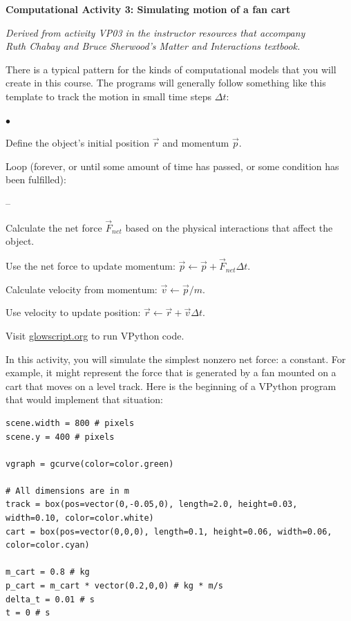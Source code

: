 \documentclass[11pt]{article}
\newcommand{\squishlist}{
   \begin{list}{$\bullet$}
    { \setlength{\itemsep}{0pt}      \setlength{\parsep}{3pt}
      \setlength{\topsep}{3pt}       \setlength{\partopsep}{0pt}
      \setlength{\leftmargin}{1.5em} \setlength{\labelwidth}{1em}
      \setlength{\labelsep}{0.5em} } }
\newcommand{\squishlistB}{
   \begin{list}{--}
    { \setlength{\itemsep}{0pt}      \setlength{\parsep}{3pt}
      \setlength{\topsep}{3pt}       \setlength{\partopsep}{0pt}
      \setlength{\leftmargin}{1.5em} \setlength{\labelwidth}{1em}
      \setlength{\labelsep}{0.5em} } }
\newcommand{\squishend}{
    \end{list}  }
\begin{document}
\begin{center}
\medskip
{\bf{Computational Activity 3: Simulating motion of a fan cart}} 
\medskip

{\em{Derived from activity VP03 in the instructor resources that
 accompany \\ Ruth Chabay and Bruce Sherwood's {\em Matter and Interactions} 
 textbook.}}
\medskip
\end{center}

There is a typical pattern for the kinds of computational models
that you will create in this course.  The programs will generally 
follow something like this template to track the motion in small 
time steps $\Delta t$:

\squishlist
\item Define the object's initial position $\vec{r}$ and momentum $\vec{p}$.
\item Loop (forever, or until some amount of time has passed, or some
  condition has been fulfilled):
\squishlistB
  \item Calculate the net force $\vec{F}_{net}$ based on the physical 
      interactions that affect the object.
  \item Use the net force to update momentum: $\vec{p} \leftarrow \vec{p} + \vec{F}_{net} \Delta t$.
  \item Calculate velocity from momentum: $\vec{v} \leftarrow \vec{p}/m$.
  \item Use velocity to update position: $\vec{r} \leftarrow \vec{r} + \vec{v} \Delta t$.
\squishend
\squishend

\bigskip

Visit \url{glowscript.org} to run VPython code.

In this activity, you will simulate the simplest nonzero net force: a constant.
For example, it might represent the force that is 
generated by a fan mounted on a cart that moves on a level track.
Here is the beginning of a VPython program that would implement that situation:


{\footnotesize{
\begin{verbatim}
scene.width = 800 # pixels
scene.y = 400 # pixels

vgraph = gcurve(color=color.green)

# All dimensions are in m 
track = box(pos=vector(0,-0.05,0), length=2.0, height=0.03, width=0.10, color=color.white)
cart = box(pos=vector(0,0,0), length=0.1, height=0.06, width=0.06, color=color.cyan)

m_cart = 0.8 # kg
p_cart = m_cart * vector(0.2,0,0) # kg * m/s
delta_t = 0.01 # s
t = 0 # s
\end{verbatim}
}}
\end{document}
